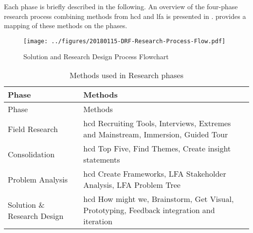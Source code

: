 Each phase is briefly described in the following.
An overview of the four-phase research process combining methods from \gls{hcd} and \gls{lfa} is presented in .  provides a mapping of these methods on the phases.

\begin{figure}
\hypertarget{fig:research-process}{%
\centering
\texttt{[image: ../figures/20180115-DRF-Research-Process-Flow.pdf]}
\caption{Solution and Research Design Process Flowchart}\label{fig:research-process}
}
\end{figure}

\hypertarget{tbl:research-methods}{}
\begin{longtable}[]{@{}ll@{}}
\caption{\label{tbl:research-methods}Methods used in Research phases}\tabularnewline
\toprule
\begin{minipage}[b]{0.28\columnwidth}\raggedright
Phase\strut
\end{minipage} & \begin{minipage}[b]{0.66\columnwidth}\raggedright
Methods\strut
\end{minipage}\tabularnewline
\midrule
\endfirsthead
\toprule
\begin{minipage}[b]{0.28\columnwidth}\raggedright
Phase\strut
\end{minipage} & \begin{minipage}[b]{0.66\columnwidth}\raggedright
Methods\strut
\end{minipage}\tabularnewline
\midrule
\endhead
\begin{minipage}[t]{0.28\columnwidth}\raggedright
Field Research\strut
\end{minipage} & \begin{minipage}[t]{0.66\columnwidth}\raggedright
\gls{hcd} Recruiting Tools, Interviews, Extremes and Mainstream, Immersion, Guided Tour\strut
\end{minipage}\tabularnewline
\begin{minipage}[t]{0.28\columnwidth}\raggedright
Consolidation\strut
\end{minipage} & \begin{minipage}[t]{0.66\columnwidth}\raggedright
\gls{hcd} Top Five, Find Themes, Create insight statements\strut
\end{minipage}\tabularnewline
\begin{minipage}[t]{0.28\columnwidth}\raggedright
Problem Analysis\strut
\end{minipage} & \begin{minipage}[t]{0.66\columnwidth}\raggedright
\gls{hcd} Create Frameworks, LFA Stakeholder Analysis, LFA Problem Tree\strut
\end{minipage}\tabularnewline
\begin{minipage}[t]{0.28\columnwidth}\raggedright
Solution \& Research Design\strut
\end{minipage} & \begin{minipage}[t]{0.66\columnwidth}\raggedright
\gls{hcd} How might we, Brainstorm, Get Visual, Prototyping, Feedback integration and iteration\strut
\end{minipage}\tabularnewline
\bottomrule
\end{longtable}

